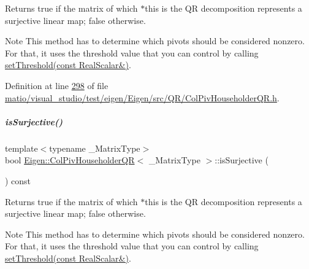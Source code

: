 \begin{DoxyReturn}{Returns}
true if the matrix of which $\ast$this is the QR decomposition represents a surjective linear map; false otherwise.
\end{DoxyReturn}
\begin{DoxyNote}{Note}
This method has to determine which pivots should be considered nonzero. For that, it uses the threshold value that you can control by calling \hyperlink{group___q_r___module_ae712cdc9f0e521cfc8061bee58ff55ee}{set\+Threshold(const Real\+Scalar\&)}. 
\end{DoxyNote}


Definition at line \hyperlink{matio_2visual__studio_2test_2eigen_2_eigen_2src_2_q_r_2_col_piv_householder_q_r_8h_source_l00298}{298} of file \hyperlink{matio_2visual__studio_2test_2eigen_2_eigen_2src_2_q_r_2_col_piv_householder_q_r_8h_source}{matio/visual\+\_\+studio/test/eigen/\+Eigen/src/\+Q\+R/\+Col\+Piv\+Householder\+Q\+R.\+h}.

\mbox{\label{group___q_r___module_a87a7d06e0b0479e5b56b19c2a4f56365}} 
\subparagraph{\texorpdfstring{is\+Surjective()}{isSurjective()}\hspace{0.1cm}{\footnotesize\ttfamily [2/2]}}
{\footnotesize\ttfamily template$<$typename \+\_\+\+Matrix\+Type$>$ \\
bool \hyperlink{group___q_r___module_class_eigen_1_1_col_piv_householder_q_r}{Eigen\+::\+Col\+Piv\+Householder\+QR}$<$ \+\_\+\+Matrix\+Type $>$\+::is\+Surjective (\begin{DoxyParamCaption}{ }\end{DoxyParamCaption}) const\hspace{0.3cm}{\ttfamily [inline]}}

\begin{DoxyReturn}{Returns}
true if the matrix of which $\ast$this is the QR decomposition represents a surjective linear map; false otherwise.
\end{DoxyReturn}
\begin{DoxyNote}{Note}
This method has to determine which pivots should be considered nonzero. For that, it uses the threshold value that you can control by calling \hyperlink{group___q_r___module_ae712cdc9f0e521cfc8061bee58ff55ee}{set\+Threshold(const Real\+Scalar\&)}. 
\end{DoxyNote}


